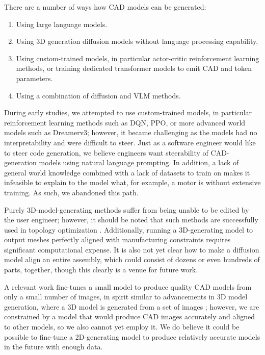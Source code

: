 \documentclass[conference]{IEEEtran}
\begin{document}
There are a number of ways how CAD models can be generated:

\begin{enumerate}
    \item Using large language models.
    \item Using 3D generation diffusion models without language processing capability,
    \item Using custom-trained models, in particular actor-critic reinforcement learning methods, or training dedicated transformer models to emit CAD and token parameters.
    \item Using a combination of diffusion and VLM methods.
\end{enumerate}

During early studies, we attempted to use custom-trained models, in particular reinforcement learning methods such as DQN, PPO, or more advanced world models such as Dreamerv3; however, it became challenging as the models had no interpretability and were difficult to steer. Just as a software engineer would like to steer code generation, we believe engineers want steerability of CAD-generation models using natural language prompting. In addition, a lack of general world knowledge combined with a lack of datasets to train on makes it infeasible to explain to the model what, for example, a motor is without extensive training. As such, we abandoned this path.

Purely 3D-model-generating methods \cite{ref38} suffer from being unable to be edited by the user engineer; however, it should be noted that such methods are successfully used in topology optimization \cite{ref11}. Additionally, running a 3D-generating model to output meshes perfectly aligned with manufacturing constraints requires significant computational expense. It is also not yet clear how to make a diffusion model align an entire assembly, which could consist of dozens or even hundreds of parts, together, though this clearly is a venue for future work.

A relevant work \cite{ref39} fine-tunes a small model to produce quality CAD models from only a small number of images, in spirit similar to advancements in 3D model generation, where a 3D model is generated from a set of images \cite{ref38}; however, we are constrained by a model that would produce CAD images accurately and aligned to other models, so we also cannot yet employ it. We do believe it could be possible to fine-tune a 2D-generating model to produce relatively accurate models in the future with enough data.
\end{document}
